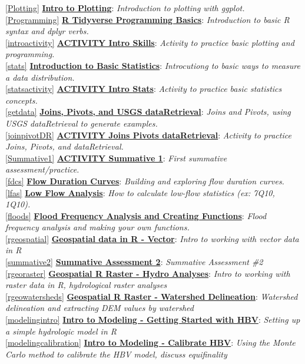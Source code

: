 \documentclass[
]{book}
\begin{document}
\ref{Plotting} \textbf{\protect\hyperlink{Plotting}{Intro to Plotting}}: \emph{Introduction to plotting with ggplot.}\\
\ref{Programming} \textbf{\protect\hyperlink{Programming}{R Tidyverse Programming Basics}}: \emph{Introduction to basic R syntax and dplyr verbs.}\\
\ref{introactivity} \textbf{\protect\hyperlink{introactivity}{ACTIVITY Intro Skills}}: \emph{Activity to practice basic plotting and programming.}\\
\ref{stats} \textbf{\protect\hyperlink{stats}{Introduction to Basic Statistics}}: \emph{Introcutiong to basic ways to measure a data distribution.}\\
\ref{statsactivity} \textbf{\protect\hyperlink{statsactivity}{ACTIVITY Intro Stats}}: \emph{Activity to practice basic statistics concepts.}\\
\ref{getdata} \textbf{\protect\hyperlink{getdata}{Joins, Pivots, and USGS dataRetrieval}}: \emph{Joins and Pivots, using USGS dataRetrieval to generate examples.}\\
\ref{joinpivotDR} \textbf{\protect\hyperlink{joinpivotDR}{ACTIVITY Joins Pivots dataRetrieval}}: \emph{Activity to practice Joins, Pivots, and dataRetrieval.}\\
\ref{Summative1} \textbf{\protect\hyperlink{Summative1}{ACTIVITY Summative 1}}: \emph{First summative assessment/practice.}\\
\ref{fdcs} \textbf{\protect\hyperlink{fdcs}{Flow Duration Curves}}: \emph{Building and exploring flow duration curves.}\\
\ref{lfas} \textbf{\protect\hyperlink{lfas}{Low Flow Analysis}}: \emph{How to calculate low-flow statistics (ex: 7Q10, 1Q10).}\\
\ref{floods} \textbf{\protect\hyperlink{floods}{Flood Frequency Analysis and Creating Functions}}: \emph{Flood frequency analysis and making your own functions.}\\
\ref{rgeospatial} \textbf{\protect\hyperlink{rgeospatial}{Geospatial data in R - Vector}}: \emph{Intro to working with vector data in R}\\
\ref{summative2} \textbf{\protect\hyperlink{summative2}{Summative Assessment 2}}: \emph{Summative Assessment \#2}\\
\ref{rgeoraster} \textbf{\protect\hyperlink{rgeoraster}{Geospatial R Raster - Hydro Analyses}}: \emph{Intro to working with raster data in R, hydrological raster analyses}\\
\ref{rgeowatersheds} \textbf{\protect\hyperlink{rgeowatersheds}{Geospatial R Raster - Watershed Delineation}}: \emph{Watershed delineation and extracting DEM values by watershed}\\
\ref{modelingintro} \textbf{\protect\hyperlink{modelingintro}{Intro to Modeling - Getting Started with HBV}}: \emph{Setting up a simple hydrologic model in R}\\
\ref{modelingcalibration} \textbf{\protect\hyperlink{modelingcalibration}{Intro to Modeling - Calibrate HBV}}: \emph{Using the Monte Carlo method to calibrate the HBV model, discuss equifinality}
\end{document}
